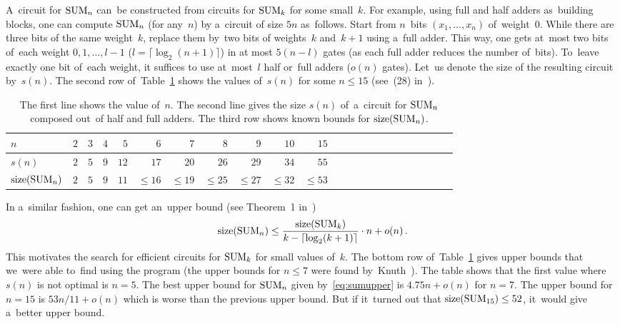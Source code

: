 A~circuit for $\operatorname{SUM}_n$ can~be constructed from circuits for $\operatorname{SUM}_k$ for some small~$k$. For example,
using full and half adders as~building blocks, one can compute $\operatorname{SUM}_n$ (for any~$n$) by a~circuit of size $5n$ as~follows. Start from $n$~bits $(x_1, \dotsc, x_n)$ of~weight~$0$. While there are three bits of the same weight~$k$, replace them by~two bits of weights~$k$ and~$k+1$ using a~full adder. This way, one gets at~most two bits of~each weight $0,1,\dotsc,l-1$ ($l=\lceil \log_2(n+1)\rceil$) in at most $5(n-l)$ gates (as each full adder reduces the number of~bits). To~leave exactly one bit
of~each weight, it suffices to use at~most~$l$ half
or~full adders ($o(n)$ gates). Let~us denote the
size of the resulting circuit by~$s(n)$. The second row
of~Table~\ref{table:sum} shows the values of~$s(n)$ for
some $n \le 15$ (see~(28) in~\cite{Knuth:2008:ACP:1377542}).

\begin{table}
\begin{center}
\begin{tabular}{lrrrrrrrrrrrrrrrrrrrrrr}
\toprule
$n$ & $2$ & $3$ & $4$ & $5$ & $6$ & $7$ & $8$ & $9$ & $10$ & $15$
\\
\midrule
$s(n)$ &$2$ & $5$ & $9$ & $12$ & $17$ & $20$ & $26$ & $29$& $34$&
$55$
\\
$\operatorname{size}(\operatorname{SUM}_n)$ & $2$ & $5$ & $9$ & $11$
& $\le 16$ & $\le 19$ & $\le 25$ & $\le 27$
& $\le 32$ & $\le 53$
\\
\bottomrule
\end{tabular}
\end{center}
\caption{The first line shows the value of~$n$. The second line gives the size $s(n)$ of~a~circuit for $\operatorname{SUM}_n$
composed out~of half and full adders. The third row shows known bounds for $\operatorname{size}(\operatorname{SUM}_n)$.}
\label{table:sum}
\end{table}

In a~similar fashion, one can get an~upper bound (see Theorem~1 in~\cite{DBLP:conf/date/Kulikov18})
\begin{equation}\label{eq:sumupper}
\operatorname{size}(\operatorname{SUM}_n) \le \frac{\operatorname{size}(\operatorname{SUM}_k)}{k-\lceil \log_2(k+1) \rceil} \cdot n + o(n) \, .
\end{equation}
This motivates the search for efficient circuits
for $\operatorname{SUM}_k$ for small values of~$k$. The bottom row
of~Table~\ref{table:sum} gives upper bounds that
we~were able to~find using the program
(the upper bounds for $n \le 7$ were found
by~Knuth~\cite{Knuth:2008:ACP:1377542}).
The table shows that the first value where $s(n)$ is not
optimal is $n=5$. The best upper bound for $\operatorname{SUM}_n$ given
by~\eqref{eq:sumupper} is $4.75n+o(n)$ for $n=7$. The upper
bound for $n=15$ is $53n/11+o(n)$ which is worse than the
previous upper bound. But if it~turned out that
$\operatorname{size}(\operatorname{SUM}_{15}) \le 52$,
it~would give a~better upper bound.

